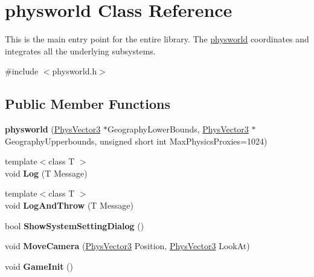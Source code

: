 \hypertarget{classphysworld}{
\section{physworld Class Reference}
\label{d5/d35/classphysworld}
}


This is the main entry point for the entire library. The \hyperlink{classphysworld}{physworld} coordinates and integrates all the underlying subsystems.  


{\ttfamily \#include $<$physworld.h$>$}\subsection*{Public Member Functions}
\begin{DoxyCompactItemize}
\item 
\hypertarget{classphysworld_a483d29f795fb355d473f860ebc2d9fe1}{
{\bfseries physworld} (\hyperlink{classPhysVector3}{PhysVector3} $\ast$GeographyLowerBounds, \hyperlink{classPhysVector3}{PhysVector3} $\ast$GeographyUpperbounds, unsigned short int MaxPhysicsProxies=1024)}
\label{d5/d35/classphysworld_a483d29f795fb355d473f860ebc2d9fe1}

\item 
\hypertarget{classphysworld_aff6ad06f795a4600a2ee8f576dbe651c}{
{\footnotesize template$<$class T $>$ }\\void {\bfseries Log} (T Message)}
\label{d5/d35/classphysworld_aff6ad06f795a4600a2ee8f576dbe651c}

\item 
\hypertarget{classphysworld_a0235f4a1bf4e794ffa7e8ddac89dff0f}{
{\footnotesize template$<$class T $>$ }\\void {\bfseries LogAndThrow} (T Message)}
\label{d5/d35/classphysworld_a0235f4a1bf4e794ffa7e8ddac89dff0f}

\item 
\hypertarget{classphysworld_a5ca73959ad02f2d6c5ba93675548cc6d}{
bool {\bfseries ShowSystemSettingDialog} ()}
\label{d5/d35/classphysworld_a5ca73959ad02f2d6c5ba93675548cc6d}

\item 
\hypertarget{classphysworld_adb378f544fbe318913fe20d25da04f90}{
void {\bfseries MoveCamera} (\hyperlink{classPhysVector3}{PhysVector3} Position, \hyperlink{classPhysVector3}{PhysVector3} LookAt)}
\label{d5/d35/classphysworld_adb378f544fbe318913fe20d25da04f90}

\item 
\hypertarget{classphysworld_afba175927e9e758c00e44b0000e72a64}{
void {\bfseries GameInit} ()}
\label{d5/d35/classphysworld_afba175927e9e758c00e44b0000e72a64}


\end{DoxyCompactItemize}
